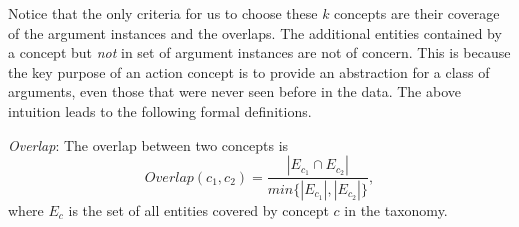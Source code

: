 Notice that the only criteria for us to choose these $k$ concepts are their
coverage of the argument instances and the overlaps. The additional entities
contained by a concept but {\em not} in set of argument instances
are not of concern.
This is because the key purpose of an action concept is to provide an
abstraction for a class of arguments, even those that were never seen before
in the data.
%
%
The above intuition leads to the following formal definitions.
\begin{definition}
\emph{Overlap}:
The overlap between two concepts is
\begin{equation}
\label{eq:overlap}
Overlap(c_1,c_2)=\frac{|E_{c_1}\cap E_{c_2}|}{min\{ |E_{c_1}|,|E_{c_2}| \}},
\end{equation}
where $E_c$ is the set of all entities covered by concept $c$ in the
taxonomy.
\end{definition}
